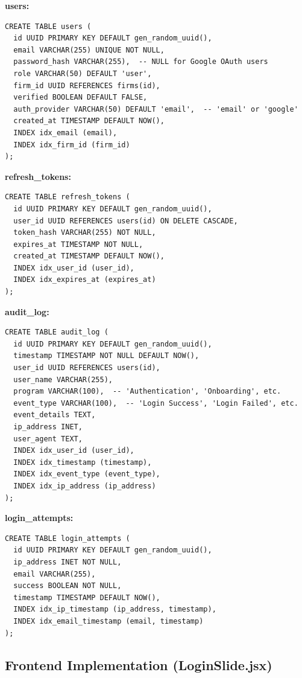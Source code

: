 \documentclass[12pt,a4paper]{article}
\begin{document}
\textbf{users:}
\begin{lstlisting}
CREATE TABLE users (
  id UUID PRIMARY KEY DEFAULT gen_random_uuid(),
  email VARCHAR(255) UNIQUE NOT NULL,
  password_hash VARCHAR(255),  -- NULL for Google OAuth users
  role VARCHAR(50) DEFAULT 'user',
  firm_id UUID REFERENCES firms(id),
  verified BOOLEAN DEFAULT FALSE,
  auth_provider VARCHAR(50) DEFAULT 'email',  -- 'email' or 'google'
  created_at TIMESTAMP DEFAULT NOW(),
  INDEX idx_email (email),
  INDEX idx_firm_id (firm_id)
);
\end{lstlisting}

\textbf{refresh\_tokens:}
\begin{lstlisting}
CREATE TABLE refresh_tokens (
  id UUID PRIMARY KEY DEFAULT gen_random_uuid(),
  user_id UUID REFERENCES users(id) ON DELETE CASCADE,
  token_hash VARCHAR(255) NOT NULL,
  expires_at TIMESTAMP NOT NULL,
  created_at TIMESTAMP DEFAULT NOW(),
  INDEX idx_user_id (user_id),
  INDEX idx_expires_at (expires_at)
);
\end{lstlisting}

\textbf{audit\_log:}
\begin{lstlisting}
CREATE TABLE audit_log (
  id UUID PRIMARY KEY DEFAULT gen_random_uuid(),
  timestamp TIMESTAMP NOT NULL DEFAULT NOW(),
  user_id UUID REFERENCES users(id),
  user_name VARCHAR(255),
  program VARCHAR(100),  -- 'Authentication', 'Onboarding', etc.
  event_type VARCHAR(100),  -- 'Login Success', 'Login Failed', etc.
  event_details TEXT,
  ip_address INET,
  user_agent TEXT,
  INDEX idx_user_id (user_id),
  INDEX idx_timestamp (timestamp),
  INDEX idx_event_type (event_type),
  INDEX idx_ip_address (ip_address)
);
\end{lstlisting}

\textbf{login\_attempts:}
\begin{lstlisting}
CREATE TABLE login_attempts (
  id UUID PRIMARY KEY DEFAULT gen_random_uuid(),
  ip_address INET NOT NULL,
  email VARCHAR(255),
  success BOOLEAN NOT NULL,
  timestamp TIMESTAMP DEFAULT NOW(),
  INDEX idx_ip_timestamp (ip_address, timestamp),
  INDEX idx_email_timestamp (email, timestamp)
);
\end{lstlisting}

\subsection{Frontend Implementation (LoginSlide.jsx)}
\end{document}
